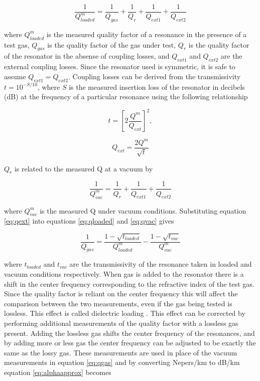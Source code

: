 \begin{equation} \label{eq:qloaded}
\frac{1}{Q_{loaded}^m} = \frac{1}{Q_{gas}} + \frac{1}{Q_{r}} + \frac{1}{Q_{ext1}} +\frac{1}{Q_{ext2}}
\end{equation}

\noindent where $Q_{loaded}^m$ is the measured quality factor of a resonance in the presence of a test gas, $Q_{gas}$ is the quality factor of the gas under test, $Q_{r}$ is the quality factor of the resonator in the absense of coupling losses, and $Q_{ext1}$ and $Q_{ext2}$ are the external coupling losses. Since the resonator used is symmetric, it is safe to assume $Q_{ext1} = Q_{ext2}$. Coupling losses can be derived from the transmissivity $t = 10^{-S/10}$, where $S$ is the measured insertion loss of the resonator in decibels (dB) at the frequency of a particular resonance using the following relationship \cite{Matthael-1980}

\begin{equation} \label{eq:t}
t = \left[ 2 \frac{Q^m}{Q_{ext}} \right]^2,
\end{equation}

\begin{equation} \label{eq:qext}
Q_{ext} = \frac{2Q^m}{\sqrt{t}}
\end{equation}

\noindent $Q_r$ is related to the measured Q at a vacuum by

\begin{equation}\label{eq:qvac}
\frac{1}{Q_{vac}^m} =  \frac{1}{Q_{r}} + \frac{1}{Q_{ext1}} +\frac{1}{Q_{ext2}}
\end{equation}

\noindent where $Q_{vac}^m$ is the measured Q under vacuum conditions. Substituting equation \ref{eq:qext} into equations \ref{eq:qloaded} and \ref{eq:qvac} gives

\begin{equation}\label{eq:qgas}
\frac{1}{Q_{gas}} = \frac{1 - \sqrt{t_{loaded}}}{Q^m_{loaded}} - \frac{1-\sqrt{t_{vac}}}{Q_{vac}^m}
\end{equation}

\noindent where $t_{loaded}$ and $t_{vac}$ are the transmissivity of the resonance taken in loaded and vacuum conditions respectively. When gas is added to the resonator there is a shift in the center frequency corresponding to the refractive index of the test gas. Since the quality factor is reliant on the center frequency this will affect the comparison between the two measurements, even if the gas being tested is lossless. This effect is called dielectric loading \cite{Deboer-1993}. This effect can be corrected by performing additional measurements of the quality factor with a lossless gas present. Adding the lossless gas shifts the center frequency of the resonances, and by adding more or less gas the center frequency can be adjusted to be exactly the same as the lossy gas. These measurements are used in place of the vacuum measurements in equation \ref{eq:qgas} and by converting Nepers/km to dB/km equation \ref{eq:alphaapprox} becomes

